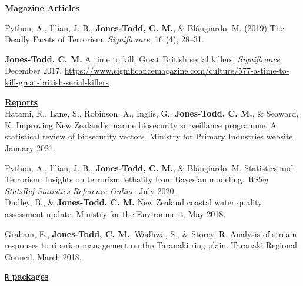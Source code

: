 \documentclass[10pt,a4paper]{moderncv}
\begin{document}
\vspace{5pt}

\underline{\textbf{Magazine Articles}}\\

\vspace{-3pt}

Python, A.,  Illian, J. B., \textbf{Jones-Todd, C. M.}, \& Bl\'{a}ngiardo, M. (2019) The Deadly Facets of Terrorism. \textit{Significance}, 16 (4), 28--31.\\

\vspace{-3pt}

\textbf{Jones-Todd, C. M.} A time to kill: Great British serial killers. \textit{Significance}. December 2017. \url{https://www.significancemagazine.com/culture/577-a-time-to-kill-great-british-serial-killers}\\

\vspace{2pt} 

\underline{\textbf{Reports}}\\

Hatami, R., Lane, S., Robinson, A.,  Inglis, G.,  \textbf{Jones-Todd, C. M.}, \& Seaward, K. Improving New Zealand’s marine biosecurity surveillance programme. A statistical review of biosecurity vectors.  Ministry for Primary Industries website. January 2021.\\

\vspace{-3pt}

Python, A.,  Illian, J. B., \textbf{Jones-Todd, C. M.}, \& Bl\'{a}ngiardo, M. Statistics and Terrorism: Insights on terrorism lethality from Bayesian modeling. \textit{Wiley StatsRef-Statistics Reference Online}. July 2020.\\

Dudley, B., \& \textbf{Jones-Todd, C. M.} New Zealand coastal water quality assessment update. Ministry for the Environment. May 2018.\\

\vspace{-3pt}

Graham, E., \textbf{Jones-Todd, C. M.}, Wadhwa, S., \& Storey, R. Analysis of stream responses to riparian management on the Taranaki ring plain. Taranaki Regional Council. March 2018.\\

\vspace{2pt}

\underline{\textbf{\texttt{R} packages}}\\
\vspace{-3pt}
\end{document}
